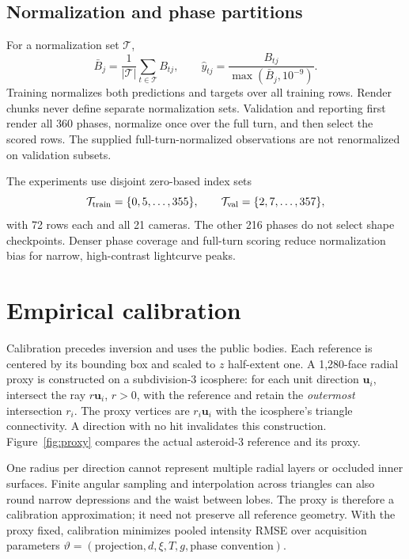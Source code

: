 \documentclass[10pt,a4paper]{article}
\newcommand{\vect}[1]{\bm{#1}}
\begin{document}
\subsection{Normalization and phase partitions}
For a normalization set $\mathcal T$,
\begin{equation}
 \bar B_j=\frac{1}{|\mathcal T|}\sum_{t\in\mathcal T}B_{tj},\qquad
 \widehat y_{tj}=\frac{B_{tj}}{\max(\bar B_j,10^{-9})}.
 \label{eq:normalization}
\end{equation}
Training normalizes both predictions and targets over all training rows.
Render chunks never define separate normalization sets. Validation and
reporting first render all 360 phases, normalize once over the full turn,
and then select the scored rows. The supplied full-turn-normalized
observations are not renormalized on validation subsets.

The experiments use disjoint zero-based index sets
\begin{equation}
 \mathcal T_{\rm train}=\{0,5,\ldots,355\},\qquad
 \mathcal T_{\rm val}=\{2,7,\ldots,357\},
\end{equation}
with 72 rows each and all 21 cameras. The other 216 phases do not select
shape checkpoints. Denser phase coverage and full-turn scoring reduce
normalization bias for narrow, high-contrast lightcurve peaks.

\section{Empirical calibration}
Calibration precedes inversion and uses the public bodies. Each reference
is centered by its bounding box and scaled to $z$ half-extent one. A
1,280-face radial proxy is constructed on a subdivision-3 icosphere:
for each unit direction $\vect u_i$, intersect the ray
$r\vect u_i$, $r>0$, with the reference and retain the \emph{outermost}
intersection $r_i$. The proxy vertices are $r_i\vect u_i$ with the
icosphere's triangle connectivity. A direction with no hit invalidates
this construction. Figure~\ref{fig:proxy} compares the actual asteroid-3
reference and its proxy.

One radius per direction cannot represent multiple radial layers or
occluded inner surfaces. Finite angular sampling and interpolation across
triangles can also round narrow depressions and the waist between lobes.
The proxy is therefore a calibration approximation; it need not preserve
all reference geometry. With the proxy fixed, calibration minimizes pooled
intensity RMSE over acquisition parameters
$\vartheta=(\text{projection},d,\xi,T,g,\text{phase convention})$.
\end{document}
